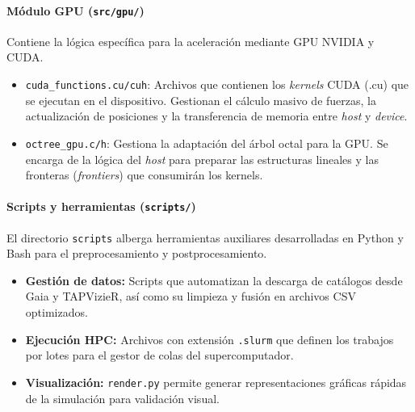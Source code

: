 \paragraph*{Módulo GPU (\texttt{src/gpu/})}
Contiene la lógica específica para la aceleración mediante GPU NVIDIA y CUDA.

\begin{itemize}
    \item \texttt{cuda\_functions.cu/cuh}: Archivos que contienen los \textit{kernels} CUDA (.cu) que se ejecutan en el dispositivo. Gestionan el cálculo masivo de fuerzas, la actualización de posiciones y la transferencia de memoria entre \textit{host} y \textit{device}.
    \item \texttt{octree\_gpu.c/h}: Gestiona la adaptación del árbol octal para la GPU. Se encarga de la lógica del \textit{host} para preparar las estructuras lineales y las fronteras (\textit{frontiers}) que consumirán los kernels.
\end{itemize}

\paragraph*{Scripts y herramientas (\texttt{scripts/})}
El directorio \texttt{scripts} alberga herramientas auxiliares desarrolladas en Python y Bash para el preprocesamiento y postprocesamiento.

\begin{itemize}
    \item \textbf{Gestión de datos:} Scripts que automatizan la descarga de catálogos desde Gaia y TAPVizieR, así como su limpieza y fusión en archivos CSV optimizados.
    \item \textbf{Ejecución HPC:} Archivos con extensión \texttt{.slurm} que definen los trabajos por lotes para el gestor de colas del supercomputador.
    \item \textbf{Visualización:} \texttt{render.py} permite generar representaciones gráficas rápidas de la simulación para validación visual.
\end{itemize}






